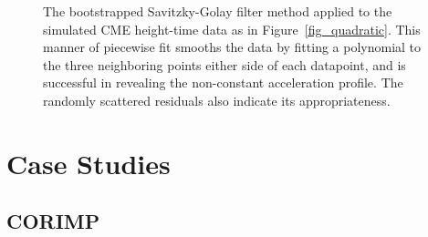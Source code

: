 \documentclass[structabstract]{aa}
\begin{document}
\begin{figure}[t]
\centering
{}
\caption{The bootstrapped Savitzky-Golay filter method applied to the simulated CME height-time data as in Figure~\ref{fig_quadratic}. This manner of piecewise fit smooths the data by fitting a polynomial to the three neighboring points either side of each datapoint, and is successful in revealing the non-constant acceleration profile. The randomly scattered residuals also indicate its appropriateness.}
\label{fig_savgol}
\end{figure}


\section{Case Studies}
\label{sect:case_studies}

\subsection{CORIMP}
\label{subsect:corimp}
\end{document}
